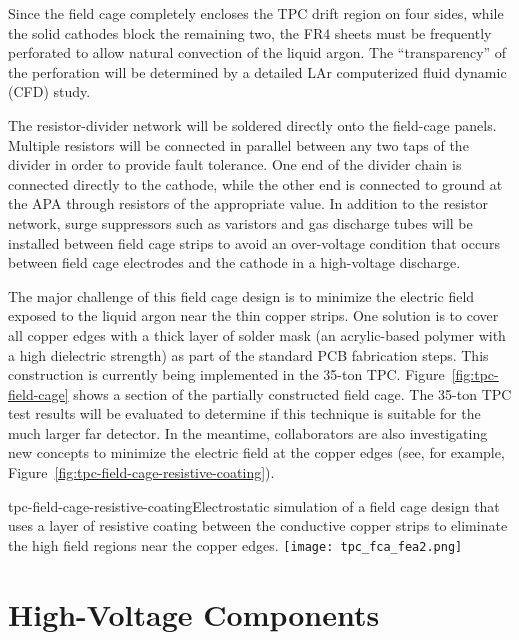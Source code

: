 Since the field cage completely encloses the TPC drift region on four sides, while the solid cathodes block the remaining two, the FR4 sheets must 
be frequently perforated to allow natural convection of the liquid argon.  
The ``transparency'' of the perforation will be determined by a 
detailed LAr computerized fluid dynamic (CFD) study.

The resistor-divider network will be soldered directly onto the field-cage panels. 
Multiple resistors will be connected in parallel between any two taps of the divider
in order to provide fault tolerance. 
One end of the divider chain is connected directly to the cathode, while the other end is connected to ground at the APA through resistors of the appropriate value. 
In addition to the resistor network, surge suppressors such as varistors and gas discharge tubes will be installed between field cage strips to avoid an over-voltage condition that occurs between field cage electrodes and the cathode in a high-voltage discharge.

The major challenge of this field cage design is to minimize the electric field exposed to the liquid argon near the thin copper strips.  One solution is to cover all copper edges with a thick layer of solder mask (an acrylic-based polymer with a high dielectric strength) as part of the standard PCB fabrication steps.  This construction is currently being implemented in the 35-ton TPC.  Figure~\ref{fig:tpc-field-cage} shows  a section of the partially constructed field cage.  The 35-ton TPC test results will be evaluated to determine if this technique is suitable for the much larger far detector.  In the meantime, collaborators are also investigating new concepts to minimize the electric field at the copper edges (see, for example, Figure~\ref{fig:tpc-field-cage-resistive-coating}).

\begin{cdrfigure}{tpc-field-cage-resistive-coating}{Electrostatic simulation of a field cage design that uses a layer of resistive coating between the conductive copper strips to eliminate the high field regions near the copper edges.}
\texttt{[image: tpc\_fca\_fea2.png]}
\end{cdrfigure}



\section{High-Voltage Components}  
\label{subsec:v5-tpc-hv}
   
